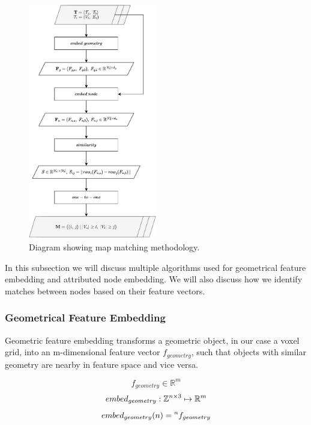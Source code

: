 \begin{figure}[h]
    \centering
    \includegraphics*[width=0.5\textwidth]{./fig/flowchart_match.pdf}
    \caption{Diagram showing map matching methodology.}
    \label{fig:flowchart_match}
\end{figure}

In this subsection we will discuss multiple algorithms used for geometrical feature embedding and attributed node embedding. We will also discuss how we identify matches between nodes based on their feature vectors.

\subsubsection{Geometrical Feature Embedding}
Geometric feature embedding transforms a geometric object, in our case a voxel grid, into an m-dimensional feature vector \(f_{geometry}\), such that objects with similar geometry are nearby in feature space and vice versa.

\begin{equation}
    \label{eq:f}
    f_{geometry} \in \mathbb{R}^m
\end{equation}
\begin{equation}
    \label{eq:embed_geometry_01}
    embed_{geometry}: \mathbb{Z}^{n \times 3} \mapsto \mathbb{R}^m
\end{equation}
\begin{equation}
    \label{eq:embed_geometry_02}
    embed_{geometry}(n) = \prescript{n}{}{f_{geometry}}
\end{equation}

